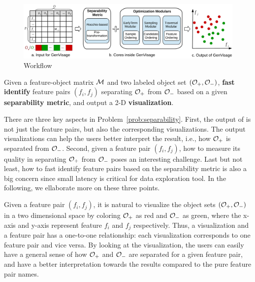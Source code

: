 
\begin{figure}[t]
	\centering
	\includegraphics[width=0.9\linewidth]{fig/workflow2.pdf}
\caption{\genviz Workflow}
\label{fig:workflow}
\end{figure} 




\begin{formulation}[Separability]\label{prob:separability}
Given a feature-object matrix $\mm$ and two labeled object set $(\oo_+,\oo_-)$, \textbf{fast identify} \topk feature pairs $(f_i,f_j)$ separating $\oo_+$ from $\oo_-$ based on a given \textbf{separability metric}, and output a 2-D \textbf{visualization}.
\end{formulation}
There are three key aspects in Problem~\ref{prob:separability}. First, the output of \genviz is not just the \topk feature pairs, but also the corresponding visualizations. The output visualizations can help the users better interpret the result, i.e., how $\oo_+$ is separated from $\oo_-$. Second, given a feature pair $(f_i,f_j)$, how to measure its quality in separating $\oo_+$ from $\oo_-$ poses an interesting challenge. Last but not least, how to fast identify \topk feature pairs based on the separability metric is also a big concern since small latency is critical for data exploration tool. In the following, we ellaborate more on these three points.

 Given a feature pair $(f_i,f_j)$, it is natural to visualize the object sets $(\oo_+,\oo_-)$ in a two dimensional space by coloring $\oo_+$ as red and $\oo_-$ as green, where the x-axis and y-axis represent feature $f_i$ and $f_j$ respectively. Thus, a visualization and a feature pair has a one-to-one relationship: each visualization corresponds to one feature pair and vice versa. By looking at the visualization, the users can easily have a general sense of how $\oo_+$ and $\oo_-$ are separated for a given feature pair, and have a better interpretation towards the results compared to the pure feature pair names.


